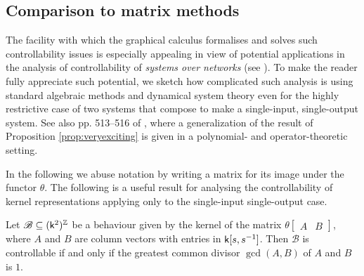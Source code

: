 \subsection{Comparison to matrix methods}
The facility with which the graphical calculus formalises and solves such
controllability issues is especially appealing in view of potential applications
in the analysis of controllability of \emph{systems over networks} (see
\cite{OFM}). To make the reader fully appreciate such potential, we sketch how
complicated such analysis is using standard algebraic methods and
dynamical system theory even for the highly restrictive case of two systems that
compose to make a single-input, single-output system.  See also pp. 513--516 of
\cite{FH}, where a generalization of the result of Proposition \ref{prop:veryexciting}
is given in a polynomial- and operator-theoretic setting. 

In the following we abuse notation by writing a matrix for its image under the
functor $\theta$.  The following is a useful result for analysing the
controllability of kernel representations applying only to the single-input
single-output case.

\begin{proposition} \label{prop.controlkernel}
  Let $\mathscr B \subseteq (\mathsf{k}^2)^{\mathbb Z}$ be a behaviour given by the kernel of the
  matrix $\theta\begin{bmatrix} A & B\end{bmatrix}$, where $A$ and $B$ are column
  vectors with entries in $\mathsf{k}[s,s^{-1}]$. Then $\mathscr B$ is controllable if
  and only if the greatest common divisor $\gcd(A,B)$ of $A$ and $B$ is $1$.
\end{proposition}

